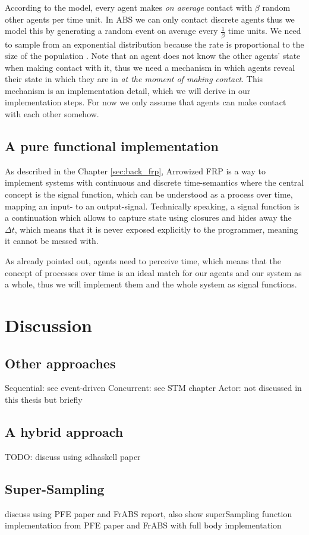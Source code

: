 According to the model, every agent makes \textit{on average} contact with $\beta$ random other agents per time unit. In ABS we can only contact discrete agents thus we model this by generating a random event on average every $\frac{1}{\beta}$ time units. We need to sample from an exponential distribution because the rate is proportional to the size of the population \cite{borshchev_system_2004}. Note that an agent does not know the other agents' state when making contact with it, thus we need a mechanism in which agents reveal their state in which they are in \textit{at the moment of making contact}. This mechanism is an implementation detail, which we will derive in our implementation steps. For now we only assume that agents can make contact with each other somehow.

\subsection{A pure functional implementation}
As described in the Chapter \ref{sec:back_frp}, Arrowized FRP \cite{hughes_generalising_2000} is a way to implement systems  with continuous and discrete time-semantics where the central concept is the signal function, which can be understood as a process over time, mapping an input- to an output-signal. Technically speaking, a signal function is a continuation which allows to capture state using closures and hides away the $\Delta t$, which means that it is never exposed explicitly to the programmer, meaning it cannot be messed with.

As already pointed out, agents need to perceive time, which means that the concept of processes over time is an ideal match for our agents and our system as a whole, thus we will implement them and the whole system as signal functions.

\section{Discussion}

\subsection{Other approaches}
Sequential: see event-driven
Concurrent: see STM chapter
Actor: not discussed in this thesis but briefly 

\subsection{A hybrid approach}
TODO: discuss using sdhaskell paper

\subsection{Super-Sampling}
discuss using PFE paper and FrABS report, also show superSampling function implementation from PFE paper and FrABS with full body implementation
